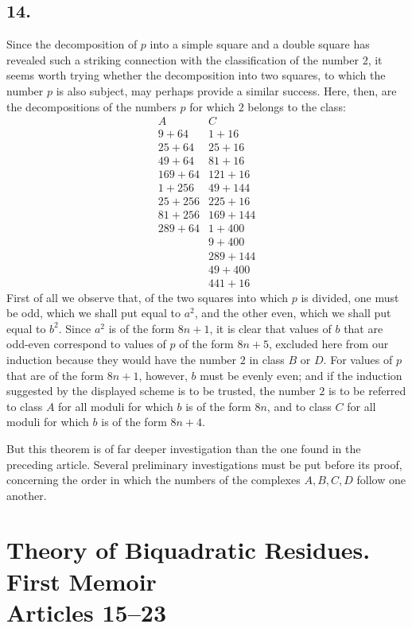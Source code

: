\documentclass[12pt]{article}
\begin{document}
\subsection*{14.}

Since the decomposition of $p$ into a simple square and a double square has revealed such a striking connection with the classification of the number $2$, it seems worth trying whether the decomposition into two squares, to which the number $p$ is also subject, may perhaps provide a similar success. Here, then, are the decompositions of the numbers $p$ for which $2$ belongs to the class:
\[
\begin{array}{c|c}
A & C\\
\hline
9+64&1+16\\
25+64&25+16\\
49+64&81+16\\
169+64&121+16\\
1+256&49+144\\
25+256&225+16\\
81+256&169+144\\
289+64&1+400\\
&9+400\\
&289+144\\
&49+400\\
&441+16
\end{array}
\]
First of all we observe that, of the two squares into which $p$ is divided, one must be odd, which we shall put equal to $a^2$, and the other even, which we shall put equal to $b^2$. Since $a^2$ is of the form $8n+1$, it is clear that values of $b$ that are odd-even correspond to values of $p$ of the form $8n+5$, excluded here from our induction because they would have the number $2$ in class $B$ or $D$. For values of $p$ that are of the form $8n+1$, however, $b$ must be evenly even; and if the induction suggested by the displayed scheme is to be trusted, the number $2$ is to be referred to class $A$ for all moduli for which $b$ is of the form $8n$, and to class $C$ for all moduli for which $b$ is of the form $8n+4$.

But this theorem is of far deeper investigation than the one found in the preceding article. Several preliminary investigations must be put before its proof, concerning the order in which the numbers of the complexes $A,B,C,D$ follow one another.



\section*{Theory of Biquadratic Residues. First Memoir\\
Articles 15--23}
\end{document}

